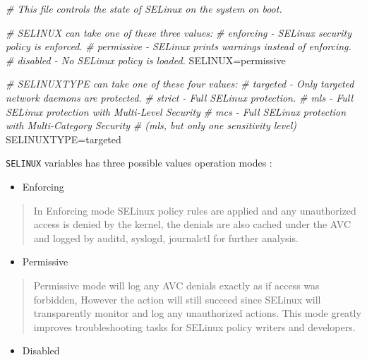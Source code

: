 \documentclass[
  14pt,
  english,
  a4paper,
]{scrreprt}
\newenvironment{Shaded}{}{}
\newcommand{\CommentTok}[1]{\textcolor[rgb]{0.38,0.63,0.69}{\textit{#1}}}
\newcommand{\NormalTok}[1]{#1}
\newcommand{\VariableTok}[1]{\textcolor[rgb]{0.10,0.09,0.49}{#1}}
\providecommand{\tightlist}{%
  \setlength{\itemsep}{0pt}\setlength{\parskip}{0pt}}
\begin{document}
\begin{Shaded}
\begin{Highlighting}[]
\CommentTok{\# This file controls the state of SELinux on the system on boot.}

\CommentTok{\# SELINUX can take one of these three values:}
\CommentTok{\#       enforcing {-} SELinux security policy is enforced.}
\CommentTok{\#       permissive {-} SELinux prints warnings instead of enforcing.}
\CommentTok{\#       disabled {-} No SELinux policy is loaded.}
\VariableTok{SELINUX=}\NormalTok{permissive}

\CommentTok{\# SELINUXTYPE can take one of these four values:}
\CommentTok{\#       targeted {-} Only targeted network daemons are protected.}
\CommentTok{\#       strict   {-} Full SELinux protection.}
\CommentTok{\#       mls      {-} Full SELinux protection with Multi{-}Level Security}
\CommentTok{\#       mcs      {-} Full SELinux protection with Multi{-}Category Security}
\CommentTok{\#                  (mls, but only one sensitivity level)}
\VariableTok{SELINUXTYPE=}\NormalTok{targeted}
\end{Highlighting}
\end{Shaded}

\texttt{SELINUX} variables has three possible values operation modes :

\begin{itemize}
\tightlist
\item
  Enforcing
\end{itemize}

\begin{quote}
In Enforcing mode SELinux policy rules are applied and any unauthorized
access is denied by the kernel, the denials are also cached under the
AVC and logged by auditd, syslogd, journalctl for further analysis.
\end{quote}

\begin{itemize}
\tightlist
\item
  Permissive
\end{itemize}

\begin{quote}
Permissive mode will log any AVC denials exactly as if access was
forbidden, However the action will still succeed since SELinux will
transparently monitor and log any unauthorized actions. This mode
greatly improves troubleshooting tasks for SELinux policy writers and
developers.
\end{quote}

\begin{itemize}
\tightlist
\item
  Disabled
\end{itemize}
\end{document}
